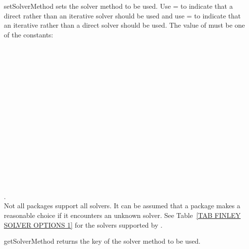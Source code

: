 \begin{methoddesc}[SolverOptions]{setSolverMethod}{}
sets the solver method to be used.
Use = to indicate that a direct
rather than an iterative solver should be used and use
= to indicate that an iterative
rather than a direct solver should be used.
The value of  must be one of the constants:\\
 \\
 \\
 \\
 \\
 \\
 \\
 \\
 \\
 \\
 \\
 \\
 \\
 \\
 \\
 \\
 \\
 .\\
Not all packages support all solvers. It can be assumed that a package makes a
reasonable choice if it encounters an unknown solver.
See Table~\ref{TAB FINLEY SOLVER OPTIONS 1} for the solvers supported by
\finley.
\end{methoddesc}

\begin{methoddesc}[SolverOptions]{getSolverMethod}{}
returns the key of the solver method to be used. 
\end{methoddesc}


